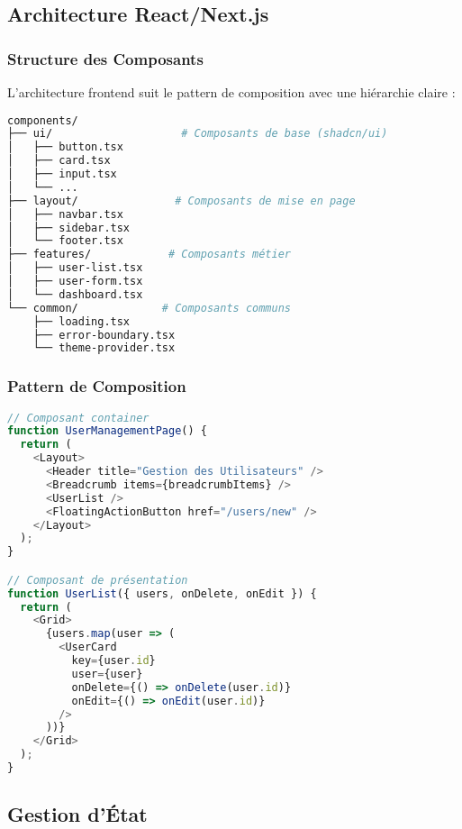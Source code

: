 \subsection{Architecture React/Next.js}

\subsubsection{Structure des Composants}

L'architecture frontend suit le pattern de composition avec une hiérarchie claire :

\begin{lstlisting}[language=bash, caption=Structure des composants]
components/
├── ui/                    # Composants de base (shadcn/ui)
│   ├── button.tsx
│   ├── card.tsx
│   ├── input.tsx
│   └── ...
├── layout/               # Composants de mise en page
│   ├── navbar.tsx
│   ├── sidebar.tsx
│   └── footer.tsx
├── features/            # Composants métier
│   ├── user-list.tsx
│   ├── user-form.tsx
│   └── dashboard.tsx
└── common/             # Composants communs
    ├── loading.tsx
    ├── error-boundary.tsx
    └── theme-provider.tsx
\end{lstlisting}

\subsubsection{Pattern de Composition}

\begin{lstlisting}[language=TypeScript, caption=Exemple de composition de composants]
// Composant container
function UserManagementPage() {
  return (
    <Layout>
      <Header title="Gestion des Utilisateurs" />
      <Breadcrumb items={breadcrumbItems} />
      <UserList />
      <FloatingActionButton href="/users/new" />
    </Layout>
  );
}

// Composant de présentation
function UserList({ users, onDelete, onEdit }) {
  return (
    <Grid>
      {users.map(user => (
        <UserCard 
          key={user.id}
          user={user}
          onDelete={() => onDelete(user.id)}
          onEdit={() => onEdit(user.id)}
        />
      ))}
    </Grid>
  );
}
\end{lstlisting}

\subsection{Gestion d'État}

